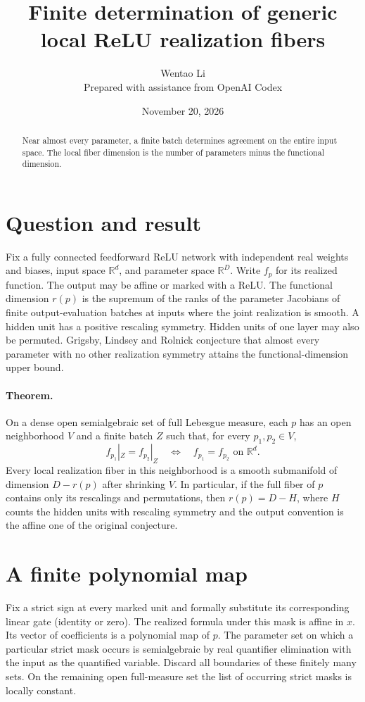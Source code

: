 \documentclass[10pt]{article}
\title{Finite determination of generic local ReLU realization fibers}
\author{Wentao Li\\{\small Prepared with assistance from OpenAI Codex}}
\date{November 20, 2026}
\begin{document}
\maketitle
\begin{abstract}
Near almost every parameter, a finite batch determines agreement on the entire input space. The local fiber dimension is the number of parameters minus the functional dimension.
\end{abstract}
\section*{Question and result}
Fix a fully connected feedforward ReLU network with independent real weights and biases, input space $\mathbb R^d$, and parameter space $\mathbb R^D$. Write $f_p$ for its realized function. The output may be affine or marked with a ReLU. The functional dimension $r(p)$ is the supremum of the ranks of the parameter Jacobians of finite output-evaluation batches at inputs where the joint realization is smooth. A hidden unit has a positive rescaling symmetry. Hidden units of one layer may also be permuted. Grigsby, Lindsey and Rolnick conjecture that almost every parameter with no other realization symmetry attains the functional-dimension upper bound.

\paragraph{Theorem.} On a dense open semialgebraic set of full Lebesgue measure, each $p$ has an open neighborhood $V$ and a finite batch $Z$ such that, for every $p_1,p_2\in V$,
\[
 f_{p_1}|_Z=f_{p_2}|_Z\quad\Longleftrightarrow\quad f_{p_1}=f_{p_2}\text{ on }\mathbb R^d.
\]
Every local realization fiber in this neighborhood is a smooth submanifold of dimension $D-r(p)$ after shrinking $V$. In particular, if the full fiber of $p$ contains only its rescalings and permutations, then $r(p)=D-H$, where $H$ counts the hidden units with rescaling symmetry and the output convention is the affine one of the original conjecture.

\section*{A finite polynomial map}
Fix a strict sign at every marked unit and formally substitute its corresponding linear gate (identity or zero). The realized formula under this mask is affine in $x$. Its vector of coefficients is a polynomial map of $p$. The parameter set on which a particular strict mask occurs is semialgebraic by real quantifier elimination with the input as the quantified variable. Discard all boundaries of these finitely many sets. On the remaining open full-measure set the list of occurring strict masks is locally constant.
\end{document}
